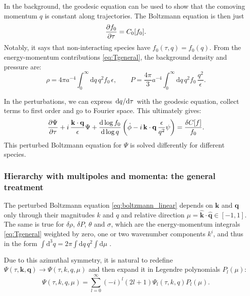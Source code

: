 \documentclass[USenglish, thumbmarks]{uiophdthesis} %
\newcommand\diff{\mathrm{d}}
\begin{document}
In the background,
the geodesic equation can be used to show that the comoving momentum $q$ is constant along trajectories.
The Boltzmann equation is then just
\begin{equation}
\pdv{f_0}{\tau} = C_0[f_0].
\label{eq:boltzmann_bg}
\end{equation}
Notably, it says that non-interacting species have $f_0(\tau, q) = f_0(q)$.
From the energy-momentum contributions \eqref{eq:Tgeneral}, the background density and pressure are:
\begin{equation}
\rho = 4\pi a^{-4} \int_0^\infty \diff{q}\,q^2 f_0 \, \epsilon , \qquad
P = \frac{4\pi}{3} a^{-4} \int_0^\infty \diff{q}\,q^2 f_0 \, \frac{q^2}{\epsilon} .
\label{eq:energy_momentum_integrals_bg}
\end{equation}

In the perturbations,
we can express $\odv{q}/{\tau}$ with the geodesic equation,
collect terms to first order and go to Fourier space.
This ultimately gives:
\begin{equation}
\pdv{\Psi}{\tau} + i \, \frac{\mathbf{k} \cdot \mathbf{q}}{\epsilon} \Psi + \odv{\log f_0}{\log q} \left(\dot{\phi} - i \, \mathbf{k} \cdot \mathbf{q} \, \frac{\epsilon}{q^2} \psi \right) = \frac{\delta C[f]}{f_0}.
\label{eq:boltzmann_linear}
\end{equation}
This perturbed Boltzmann equation for $\Psi$ is solved differently for different species.

\subsubsection{Hierarchy with multipoles and momenta: the general treatment}

The perturbed Boltzmann equation \eqref{eq:boltzmann_linear}
depends on $\mathbf{k}$ and $\mathbf{q}$ only through their magnitudes $k$ and $q$
and relative direction $\mu = \hat{\mathbf{k}} \cdot \hat{\mathbf{q}} \in [-1, 1]$.
The same is true for $\delta\rho$, $\delta P$, $\theta$ and $\sigma$,
which are the energy-momentum integrals \eqref{eq:Tgeneral} weighted by zero, one or two wavenumber components $k^i$,
and thus in the form $\int \diff^3{q} = 2\pi \int \diff{q} \, q^2 \int \diff{\mu}$
\cite[equation (53)]{maCosmologicalPerturbationTheory1995a}.

Due to this azimuthal symmetry,
it is natural to redefine $\Psi(\tau, \mathbf{k}, \mathbf{q}) \to \Psi(\tau, k, q, \mu)$
and then expand it in Legendre polynomials $P_l(\mu)$:
\begin{equation}
\Psi(\tau, k, q, \mu) = \sum_{l=0}^\infty (-i)^l (2l+1) \Psi_l(\tau, k, q) P_l(\mu) .
\label{eq:decompose_legendre}
\end{equation}
\end{document}
